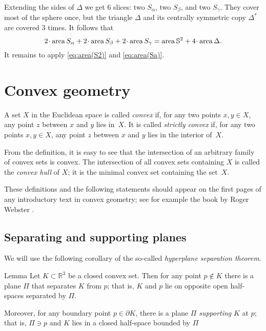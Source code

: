 Extending the sides of $\Delta$ we get 6 slices: two $S_\alpha$, two $S_\beta$, and two $S_\gamma$.
They cover most of the sphere once,
but the triangle $\Delta$ and its centrally symmetric copy $\Delta^{*}$ are covered 3 times.
It follows that
\[2\cdot \area S_\alpha+2\cdot \area S_\beta+2\cdot \area S_\gamma
=\area\mathbb{S}^2+4\cdot\area\Delta.\]
It remains to apply \ref{eq:area(S2)} and \ref{eq:area(Sa)}.
\qeds





\section{Convex geometry}

A set $X$ in the Euclidean space is called \emph{convex} if, for any two points $x,y\in X$, any point $z$ between $x$ and $y$ lies in~$X$.
It is called  {}\emph{strictly convex} if, for any two points $x,y\in X$, any point $z$ between $x$ and $y$ lies in the interior of~$X$.

From the definition, it is easy to see that the intersection of an arbitrary family of convex sets is convex. 
The intersection of all convex sets containing $X$ is called the \emph{convex hull} of $X$;
it is the minimal convex set containing the set~$X$.

These definitions and the following statements should appear on the first pages of any introductory text in convex geometry;
see for example the book by Roger Webster \cite{webster}.

\subsection*{Separating and supporting planes}

We will use the following corollary of the so-called \emph{hyperplane separation theorem}.

\begin{thm}{Lemma}\label{lem:separation}
Let $K\subset \mathbb{R}^3$ be a closed convex set.
Then for any point $p\notin K$ there is a plane $\Pi$ that separates $K$ from $p$;
that is, $K$ and $p$ lie on opposite open half-spaces separated by $\Pi$.

Moreover, for any boundary point $p\in\partial K$, there is a plane $\Pi$ \emph{supporting} $K$ at $p$;
that is, $\Pi\ni p$ and $K$ lies in a closed half-space bounded by $\Pi$
\end{thm}

